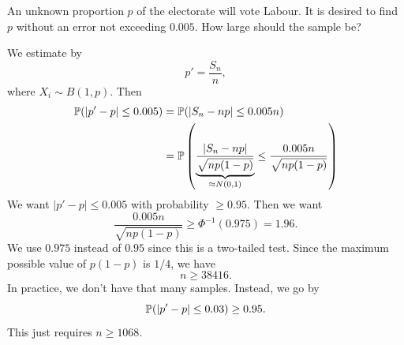 \documentclass[a4paper]{article}
\begin{document}
\begin{eg}
  An unknown proportion $p$ of the electorate will vote Labour. It is desired to find $p$ without an error not exceeding $0.005$. How large should the sample be?

  We estimate by
  \[
    p' = \frac{S_n}{n},
  \]
  where $X_i\sim B(1, p)$. Then
  \begin{align*}
    \P(|p' - p| \leq 0.005) &= \P(|S_n - np| \leq 0.005n)\\
    &= \P\left(\underbrace{\frac{|S_n - np|}{\sqrt{np(1 - p)}}}_{\approx N(0, 1)} \leq \frac{0.005n}{\sqrt{np(1 - p)}}\right)
  \end{align*}
  We want $|p' - p| \leq 0.005$ with probability $\geq 0.95$. Then we want
  \[
    \frac{0.005n}{\sqrt{np(1 - p)}} \geq \Phi^{-1}(0.975) = 1.96.
  \]
  We use $0.975$ instead of $0.95$ since this is a two-tailed test. Since the maximum possible value of $p(1 - p)$ is $1/4$, we have
  \[
    n \geq 38416.
  \]
  In practice, we don't have that many samples. Instead, we go by
  \[
    \P(|p' - p| \leq 0.03) \geq 0.95.
  \]
  This just requires $n \geq 1068$.
\end{eg}
\end{document}
